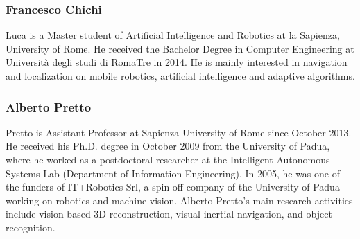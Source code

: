 \documentclass{llncs}
\begin{document}
\subsubsection*{Francesco Chichi}
Luca is a Master student of Artificial Intelligence and Robotics at la Sapienza, University of Rome. He received the Bachelor Degree in Computer Engineering at Università degli studi di RomaTre in 2014. He is mainly interested in navigation and localization on mobile robotics, artificial intelligence and adaptive algorithms.


\subsubsection*{Alberto Pretto}

Pretto is Assistant Professor at Sapienza University of Rome since October 2013. 
He received his Ph.D. degree in October 2009 from the University of Padua, where he worked as a postdoctoral researcher at the Intelligent Autonomous Systems Lab (Department of Information Engineering). 
In 2005, he was one of the funders of IT+Robotics Srl, a spin-off company of the University of Padua working on robotics and machine vision. 
Alberto Pretto's main research activities include vision-based 3D reconstruction, visual-inertial navigation, and object recognition.
\end{document}
